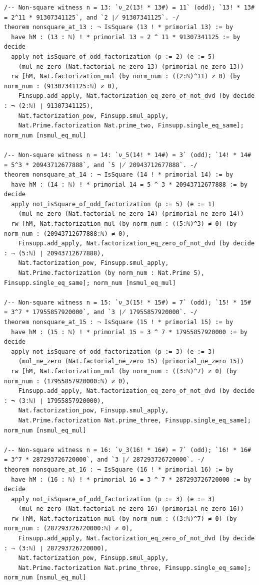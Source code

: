 \documentclass[11pt]{article}
\theoremstyle{definition}
\begin{document}
\begin{lstlisting}
/-- Non-square witness n = 13: `ν_2(13! * 13#) = 11` (odd); `13! * 13# = 2^11 * 91307341125`, and `2 ∤ 91307341125`. -/
theorem nonsquare_at_13 : ¬ IsSquare (13 ! * primorial 13) := by
  have hM : (13 : ℕ) ! * primorial 13 = 2 ^ 11 * 91307341125 := by decide
  apply not_isSquare_of_odd_factorization (p := 2) (e := 5)
    (mul_ne_zero (Nat.factorial_ne_zero 13) (primorial_ne_zero 13))
  rw [hM, Nat.factorization_mul (by norm_num : ((2:ℕ)^11) ≠ 0) (by norm_num : (91307341125:ℕ) ≠ 0),
    Finsupp.add_apply, Nat.factorization_eq_zero_of_not_dvd (by decide : ¬ (2:ℕ) ∣ 91307341125),
    Nat.factorization_pow, Finsupp.smul_apply,
    Nat.Prime.factorization Nat.prime_two, Finsupp.single_eq_same]; norm_num [nsmul_eq_mul]

/-- Non-square witness n = 14: `ν_5(14! * 14#) = 3` (odd); `14! * 14# = 5^3 * 20943712677888`, and `5 ∤ 20943712677888`. -/
theorem nonsquare_at_14 : ¬ IsSquare (14 ! * primorial 14) := by
  have hM : (14 : ℕ) ! * primorial 14 = 5 ^ 3 * 20943712677888 := by decide
  apply not_isSquare_of_odd_factorization (p := 5) (e := 1)
    (mul_ne_zero (Nat.factorial_ne_zero 14) (primorial_ne_zero 14))
  rw [hM, Nat.factorization_mul (by norm_num : ((5:ℕ)^3) ≠ 0) (by norm_num : (20943712677888:ℕ) ≠ 0),
    Finsupp.add_apply, Nat.factorization_eq_zero_of_not_dvd (by decide : ¬ (5:ℕ) ∣ 20943712677888),
    Nat.factorization_pow, Finsupp.smul_apply,
    Nat.Prime.factorization (by norm_num : Nat.Prime 5), Finsupp.single_eq_same]; norm_num [nsmul_eq_mul]

/-- Non-square witness n = 15: `ν_3(15! * 15#) = 7` (odd); `15! * 15# = 3^7 * 17955857920000`, and `3 ∤ 17955857920000`. -/
theorem nonsquare_at_15 : ¬ IsSquare (15 ! * primorial 15) := by
  have hM : (15 : ℕ) ! * primorial 15 = 3 ^ 7 * 17955857920000 := by decide
  apply not_isSquare_of_odd_factorization (p := 3) (e := 3)
    (mul_ne_zero (Nat.factorial_ne_zero 15) (primorial_ne_zero 15))
  rw [hM, Nat.factorization_mul (by norm_num : ((3:ℕ)^7) ≠ 0) (by norm_num : (17955857920000:ℕ) ≠ 0),
    Finsupp.add_apply, Nat.factorization_eq_zero_of_not_dvd (by decide : ¬ (3:ℕ) ∣ 17955857920000),
    Nat.factorization_pow, Finsupp.smul_apply,
    Nat.Prime.factorization Nat.prime_three, Finsupp.single_eq_same]; norm_num [nsmul_eq_mul]

/-- Non-square witness n = 16: `ν_3(16! * 16#) = 7` (odd); `16! * 16# = 3^7 * 287293726720000`, and `3 ∤ 287293726720000`. -/
theorem nonsquare_at_16 : ¬ IsSquare (16 ! * primorial 16) := by
  have hM : (16 : ℕ) ! * primorial 16 = 3 ^ 7 * 287293726720000 := by decide
  apply not_isSquare_of_odd_factorization (p := 3) (e := 3)
    (mul_ne_zero (Nat.factorial_ne_zero 16) (primorial_ne_zero 16))
  rw [hM, Nat.factorization_mul (by norm_num : ((3:ℕ)^7) ≠ 0) (by norm_num : (287293726720000:ℕ) ≠ 0),
    Finsupp.add_apply, Nat.factorization_eq_zero_of_not_dvd (by decide : ¬ (3:ℕ) ∣ 287293726720000),
    Nat.factorization_pow, Finsupp.smul_apply,
    Nat.Prime.factorization Nat.prime_three, Finsupp.single_eq_same]; norm_num [nsmul_eq_mul]


\end{lstlisting}
\end{document}
